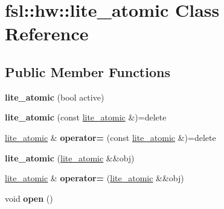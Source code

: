 \hypertarget{classfsl_1_1hw_1_1lite__atomic}{}\section{fsl\+::hw\+::lite\+\_\+atomic Class Reference}
\label{classfsl_1_1hw_1_1lite__atomic}
\subsection*{Public Member Functions}
\begin{DoxyCompactItemize}
\item 
\mbox{\label{classfsl_1_1hw_1_1lite__atomic_a6ba4422a2bd8683dd9a805dfdcc41a08}} 
{\bfseries lite\+\_\+atomic} (bool active)
\item 
\mbox{\label{classfsl_1_1hw_1_1lite__atomic_affe41e5fe33765b6220544a4ef0d26a3}} 
{\bfseries lite\+\_\+atomic} (const \mbox{\hyperlink{classfsl_1_1hw_1_1lite__atomic}{lite\+\_\+atomic}} \&)=delete
\item 
\mbox{\label{classfsl_1_1hw_1_1lite__atomic_a0a2389292b56f4f8ef770c690c9282c9}} 
\mbox{\hyperlink{classfsl_1_1hw_1_1lite__atomic}{lite\+\_\+atomic}} \& {\bfseries operator=} (const \mbox{\hyperlink{classfsl_1_1hw_1_1lite__atomic}{lite\+\_\+atomic}} \&)=delete
\item 
\mbox{\label{classfsl_1_1hw_1_1lite__atomic_ac433ea4d2664604b168c62e95073d821}} 
{\bfseries lite\+\_\+atomic} (\mbox{\hyperlink{classfsl_1_1hw_1_1lite__atomic}{lite\+\_\+atomic}} \&\&obj)
\item 
\mbox{\label{classfsl_1_1hw_1_1lite__atomic_a978fd21cf4628ab8c573564faf43df6d}} 
\mbox{\hyperlink{classfsl_1_1hw_1_1lite__atomic}{lite\+\_\+atomic}} \& {\bfseries operator=} (\mbox{\hyperlink{classfsl_1_1hw_1_1lite__atomic}{lite\+\_\+atomic}} \&\&obj)
\item 
\mbox{\label{classfsl_1_1hw_1_1lite__atomic_a6d17c7114d562df44f10af8bfc1baf41}} 
void {\bfseries open} ()
\item 
\mbox{\label{classfsl_1_1hw_1_1lite__atomic_a035cce88290085a8503a3186686b847a}} 

\end{DoxyCompactItemize}
